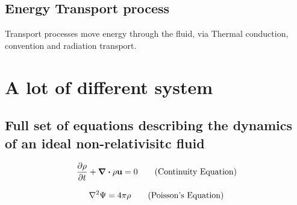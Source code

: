 \documentclass[12pt,a4paper]{article}
\begin{document}
    \subsection{Energy Transport process}
        Transport processes move energy through the fluid, via
        Thermal conduction, convention and radiation transport.
\section{A lot of different system}
    \subsection{Full set of equations describing the dynamics of an ideal non-relativisitc fluid}
        \begin{equation}
            \pdv{\rho}{t} + \div{\rho \vb{u}} = 0 \tag{Continuity Equation}
        \end{equation}
        \begin{equation}
            \tag{Momentum Equation}
        \end{equation} 
        \begin{equation}
            \laplacian{\Psi} = 4\pi\rho \tag{Poisson's Equation}
        \end{equation}
        \begin{equation}
            \tag{Energy Equation}
        \end{equation}
        \begin{equation}
            \tag{Definition fo Total energy}
        \end{equation}
        \begin{equation}
            \tag{EoS of total energy}
        \end{equation}
        \begin{equation}
            \tag{Internal Energy}
        \end{equation}
\end{document}
